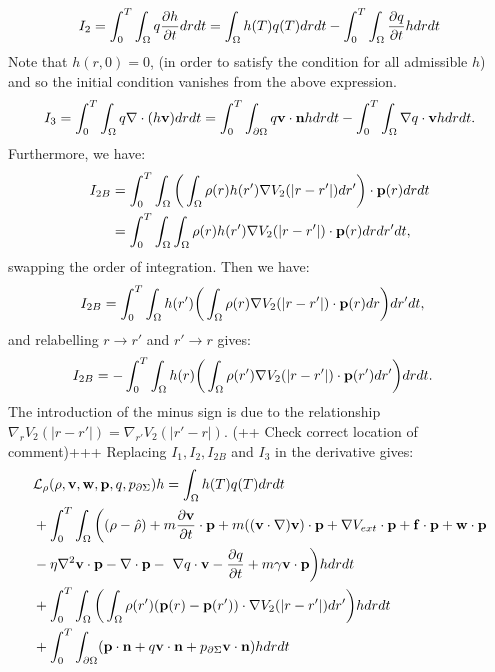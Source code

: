 \begin{align*}
I_2 = \int_0^T \int_\Omega q\frac{\partial h}{\partial t} dr dt = \int_\Omega h(T) q(T) dr dt - \int_0^T \int_\Omega  \frac{\partial q}{\partial t}h dr dt
\end{align*}
Note that ${h}(r,0)=0$, (in order to satisfy the condition for all admissible ${h}$) and so the initial condition vanishes from the above expression.
\begin{align*}
I_3= \int_0^T \int_\Omega q\nabla \cdot (h \mathbf{v}) dr dt = \int_0^T \int_{\partial \Omega} q \mathbf{v} \cdot \mathbf{n} h dr dt - \int_0^T \int_\Omega \nabla q \cdot \mathbf{v} h dr dt.
\end{align*}
Furthermore, we have:
\begin{align*}
I_{2B}&= \int_0^T \int_\Omega \bigg(\int_\Omega \rho(r) h(r') \nabla V_2(|r-r'|)dr'\bigg) \cdot \mathbf{p}(r) drdt\\
&=\int_0^T \int_\Omega \int_\Omega \rho(r) h(r') \nabla V_2(|r-r'|) \cdot \mathbf{p}(r) drdr'dt,
\end{align*}
swapping the order of integration. Then we have:
\begin{align*}
I_{2B}&= \int_0^T \int_\Omega  h(r')\bigg(\int_\Omega  \rho(r)\nabla V_2(|r-r'|) \cdot \mathbf{p}(r) dr \bigg)dr'dt,
\end{align*}
and relabelling $r \to r'$ and $r' \to r$ gives:
\begin{align*}
I_{2B}&= -\int_0^T \int_\Omega  h(r)\bigg(\int_\Omega  \rho(r')\nabla V_2(|r-r'|) \cdot \mathbf{p}(r') dr' \bigg)drdt.
\end{align*}
The introduction of the minus sign is due to the relationship $\nabla_r V_2(|r - r'|) = \nabla_{r'} V_2(|r' - r|)$.  (++ Check correct location of comment)+++
Replacing $I_1, I_2, I_{2B}$ and $I_3$ in the derivative gives:
\begin{align*}
&\mathcal{L}_\rho(\rho,\mathbf{v},\mathbf{w},\mathbf{p},q,{p}_{\partial \Sigma})h = \int_\Omega h(T) q(T) dr dt  \\
&+ \int_0^T \int_\Omega \bigg( (\rho - \hat {\rho}) +m  \frac{\partial \mathbf{v}}{\partial t}\cdot \mathbf{p} + m  ((\mathbf{v} \cdot \nabla)\mathbf{v} )\cdot \mathbf{p}+ \nabla V_{ext}\cdot \mathbf{p} + \mathbf{f} \cdot \mathbf{p} + \mathbf{w} \cdot \mathbf{p} \\
&- \eta \nabla^2 \mathbf{v} \cdot \mathbf{p} -\nabla\cdot \mathbf{p}  - \ \nabla q \cdot \mathbf{v}  -  \frac{\partial q}{\partial t} + m \gamma \mathbf{v} \cdot \mathbf{p}\bigg) h dr dt \\
&+ \int_0^T \int_\Omega  \bigg(\int_\Omega  \rho(r')(\mathbf{p}(r) - \mathbf{p}(r')) \cdot\nabla V_2(|r-r'|)   dr'  \bigg)hdr dt\\
&+\int_0^T \int_{\partial \Omega} ( \mathbf{p} \cdot \mathbf{n}  +  q \mathbf{v} \cdot \mathbf{n}   +{p}_{\partial \Sigma} \mathbf{v} \cdot \mathbf{n})h  dr dt
\end{align*}
